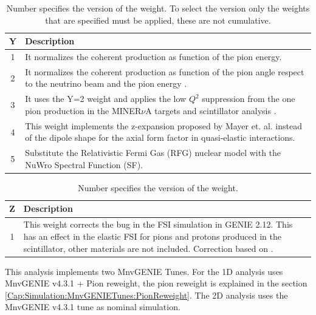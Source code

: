 \begin{table}[!htb]
    \centering
    \begin{tabular}{c|p{4.5in}}
        \textbf{Y} & \textbf{Description} \\ \hline
        1 & It normalizes the coherent production as function of the pion energy\cite{CoherentWeight}. \\ \hline
        2 & It normalizes the coherent production as function of the pion angle respect to the neutrino beam and the pion energy \cite{CoherentWeight}. \\ \hline
        3 & It uses the Y=2 weight and applies the low $Q^2$ suppression from the one pion production in the MINER$\nu$A targets and scintillator analysis \cite{AaronThesis}\cite{Bercellie.131.011801}. \\ \hline
        4 & This weight implements the z-expansion proposed by Mayer et. al. \cite{ZExpansionPhysRevD.93.113015} instead of the dipole shape for the axial form factor in quasi-elastic interactions.  \\ \hline
        5 & Substitute the Relativistic Fermi Gas (RFG) nuclear model with the NuWro Spectral Function (SF)\cite{GolanThesis}. \\ 
        
    \end{tabular}
    \caption{Number specifies the version of the weight. To select the version only the weights that are specified must be applied, these are not cumulative.}
    \label{tab:Simulation:MnvGENIETunes:Y}
\end{table}

\begin{table}[!htb]
    \centering
    \begin{tabular}{c|p{4.5in}}
        \textbf{Z} & \textbf{Description} \\ \hline
        1 & This weight corrects the bug in the FSI simulation in GENIE 2.12. This has an effect in the elastic FSI for pions and protons produced in the scintillator, other materials are not included. Correction based on \cite{harewood2019elastic}.  \\
    \end{tabular}
    \caption{Number specifies the version of the weight.}
    \label{tab:Simulation:MnvGENIETunes:Z}
\end{table}

This analysis implements two MnvGENIE Tunes. For the 1D analysis uses MnvGENIE v4.3.1 + Pion reweight, the pion reweight is explained in the section \ref{Cap:Simulation:MnvGENIETunes:PionReweight}. The 2D analysis uses the MnvGENIE v4.3.1 tune as nominal simulation.

